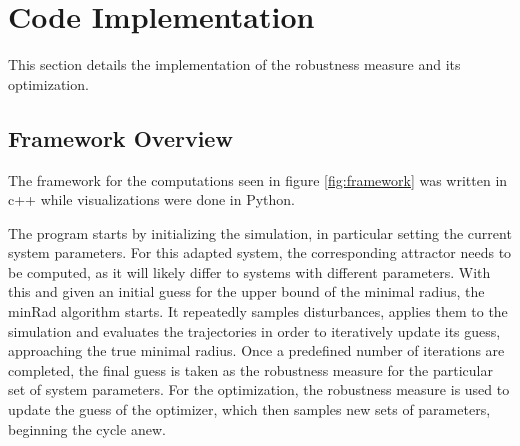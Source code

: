 



    


\section{Code Implementation} \label{codeimplementation}

This section details the implementation of the robustness measure and its optimization. 

\subsection{Framework Overview} \label{framework}

The framework for the computations seen in figure \ref{fig:framework} was written in c++ while visualizations were done in Python.  

The program starts by initializing the simulation, in particular setting the current system parameters. For this adapted system, the corresponding attractor needs to be computed, as it will likely differ to systems with different parameters. With this and given an initial guess for the upper bound of the minimal radius, the minRad algorithm starts. It repeatedly samples disturbances, applies them to the simulation and evaluates the trajectories in order to iteratively update its guess, approaching the true minimal radius. Once a predefined number of iterations are completed, the final guess is taken as the robustness measure for the particular set of system parameters. For the optimization, the robustness measure is used to update the guess of the optimizer, which then samples new sets of parameters, beginning the cycle anew. 


